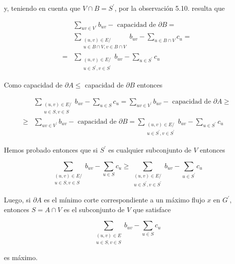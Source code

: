 \documentclass[10pt]{article}
\begin{document}
y, teniendo en cuenta que $V \cap B=S^{\prime}$, por la observación 5.10. resulta que

$$
\begin{aligned}
& \sum_{u v \in V^{\prime}} b_{u v}-\text { capacidad de } \partial B= \\
& \sum_{\substack{(u, v) \in E / \\
u \in B \cap V, v \in B \cap V}} b_{u v}-\sum_{u \in B \cap V} c_{u}= \\
= & \sum_{\substack{(u, v) \in E / \\
u \in S^{\prime}, v \in S^{\prime}}} b_{u v}-\sum_{u \in S^{\prime}} c_{u}
\end{aligned}
$$

Como capacidad de $\partial A \leq$ capacidad de $\partial B$ entonces

$$
\begin{aligned}
& \sum_{\substack{(u, v) \in E / \\
u \in S, v \in S}} b_{u v}-\sum_{u \in S} c_{u}=\sum_{u v \in V^{\prime}} b_{u v}-\text { capacidad de } \partial A \geq \\
\geq & \sum_{u v \in V^{\prime}} b_{u v}-\text { capacidad de } \partial B=\sum_{\substack{(u, v) \in E / \\
u \in S^{\prime}, v \in S^{\prime}}} b_{u v}-\sum_{u \in S^{\prime}} c_{u}
\end{aligned}
$$

Hemos probado entonces que si $S^{\prime}$ es cualquier subconjunto de $V$ entonces

$$
\sum_{\substack{(u, v) \in E / \\ u \in S, v \in S}} b_{u v}-\sum_{u \in S} c_{u} \geq \sum_{\substack{(u, v) \in E / \\ u \in S^{\prime}, v \in S^{\prime}}} b_{u v}-\sum_{u \in S^{\prime}} c_{u}
$$

Luego, si $\partial A$ es el mínimo corte correspondiente a un máximo flujo $x$ en $G^{\prime}$, entonces $S=A \cap V$ es el subconjunto de $V$ que satisface

$$
\sum_{\substack{(u, v) \in E \\ u \in S, v \in S}} b_{u v}-\sum_{u \in S} c_{u}
$$

es máximo.
\end{document}
